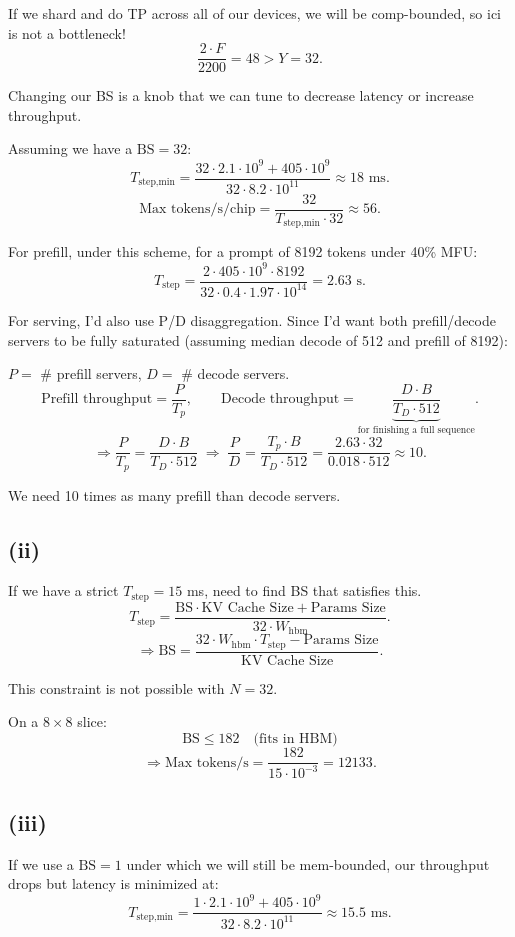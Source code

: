 \documentclass[11pt]{article}
\newcommand{\Tstep}{T_{\text{step}}}
\newcommand{\Tstepmin}{T_{\text{step,min}}}
\newcommand{\Whbm}{W_{\text{hbm}}}
\begin{document}
If we shard and do TP across all of our devices, we will be comp-bounded, so ici is not a bottleneck!
\[
\frac{2 \cdot F}{2200} = 48 > Y = 32.
\]

Changing our BS is a knob that we can tune to decrease latency or increase throughput.

Assuming we have a $\text{BS} = 32$:
\[
\Tstepmin = \frac{32 \cdot 2.1 \cdot 10^9 + 405 \cdot 10^9}{32 \cdot 8.2 \cdot 10^{11}} \approx 18 \text{ ms.}
\]
\[
\text{Max tokens/s/chip} = \frac{32}{\Tstepmin \cdot 32} \approx 56.
\]

For prefill, under this scheme, for a prompt of 8192 tokens under 40\% MFU:
\[
\Tstep = \frac{2 \cdot 405 \cdot 10^9 \cdot 8192}{32 \cdot 0.4 \cdot 1.97 \cdot 10^{14}} = 2.63 \text{ s.}
\]

For serving, I'd also use P/D disaggregation. Since I'd want both prefill/decode servers to be fully saturated (assuming median decode of 512 and prefill of 8192):

$P = $ \# prefill servers, $D = $ \# decode servers.
\[
\text{Prefill throughput} = \frac{P}{T_p}, \qquad \text{Decode throughput} = \underbrace{\frac{D \cdot B}{T_D \cdot 512}}_{\text{for finishing a full sequence}}.
\]
\[
\Rightarrow \frac{P}{T_p} = \frac{D \cdot B}{T_D \cdot 512} \;\Rightarrow\; \frac{P}{D} = \frac{T_p \cdot B}{T_D \cdot 512} = \frac{2.63 \cdot 32}{0.018 \cdot 512} \approx 10.
\]

We need 10 times as many prefill than decode servers.

\subsection*{(ii)}

If we have a strict $\Tstep = 15$ ms, need to find BS that satisfies this.
\[
\Tstep = \frac{\text{BS} \cdot \text{KV Cache Size} + \text{Params Size}}{32 \cdot \Whbm}.
\]
\[
\Rightarrow \text{BS} = \frac{32 \cdot \Whbm \cdot \Tstep - \text{Params Size}}{\text{KV Cache Size}}.
\]

This constraint is not possible with $N = 32$.

On a $8 \times 8$ slice:
\[
\text{BS} \leq 182 \quad \text{(fits in HBM)}
\]
\[
\Rightarrow \text{Max tokens/s} = \frac{182}{15 \cdot 10^{-3}} = 12133.
\]

\subsection*{(iii)}

If we use a $\text{BS} = 1$ under which we will still be mem-bounded, our throughput drops but latency is minimized at:
\[
\Tstepmin = \frac{1 \cdot 2.1 \cdot 10^9 + 405 \cdot 10^9}{32 \cdot 8.2 \cdot 10^{11}} \approx 15.5 \text{ ms.}
\]
\end{document}
